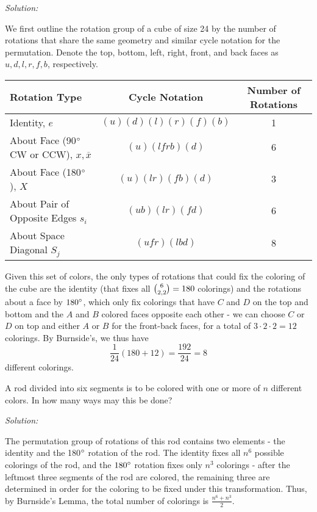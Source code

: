 \documentclass[12pt]{scrartcl}
\newenvironment{problem}[2][Problem]{\begin{trivlist}
\item[\hskip \labelsep {\bfseries #1}\hskip \labelsep {\bfseries #2.}]}{\end{trivlist}}
\newenvironment{solution}
    {\emph{Solution:}
    }
    {
    \qedhere
    }
\begin{document}
\begin{solution}
We first outline the rotation group of a cube of size 24 by the number of rotations that share the same geometry and similar cycle notation for the permutation. Denote the top, bottom, left, right, front, and back faces as $u, d, l, r, f, b$, respectively. 
\begin{center}
\begin{tabular}{m{5cm}| c | c}
\centering Rotation Type & Cycle Notation & Number of Rotations \\ \hline 
\centering Identity, $e$ & $(u)(d)(l)(r)(f)(b)$ & 1 \\ 
\centering About Face (90$^\circ$ CW or CCW), $x, \overline{x}$ & $(u)(lfrb)(d)$ & 6 \\
\centering About Face (180$^\circ$), $X$ & $(u)(lr)(fb)(d)$ & 3 \\
\centering About Pair of Opposite Edges $s_i$ & $(ub)(lr)(fd)$ & 6 \\
\centering About Space Diagonal $S_j$ & $(ufr)(lbd)$ & 8 \\
\end{tabular}
\end{center}

Given this set of colors, the only types of rotations that could fix the coloring of the cube are the identity (that fixes all $\tbinom{6}{2, 2} = 180$ colorings) and the rotations about a face by $180^\circ$, which only fix colorings that have $C$ and $D$ on the top and bottom and the $A$ and $B$ colored faces opposite each other - we can choose $C$ or $D$ on top and either $A$ or $B$ for the front-back faces, for a total of $3 \cdot 2 \cdot 2 = 12$ colorings. By Burnside's, we thus have
\[
	\frac{1}{24}(180 + 12) = \frac{192}{24} = \boxed{8}
\]
different colorings. 
\end{solution}

\begin{problem}{3} 
A rod divided into six segments is to be colored with one or more of $n$ different colors. In how many ways may this be done? 

\end{problem}

\begin{solution}
The permutation group of rotations of this rod contains two elements - the identity and the 180$^\circ$ rotation of the rod. The identity fixes all $n^6$ possible colorings of the rod, and the $180^\circ$ rotation fixes only $n^3$ colorings - after the leftmost three segments of the rod are colored, the remaining three are determined in order for the coloring to be fixed under this transformation. Thus, by Burnside's Lemma, the total number of colorings is $\boxed{\frac{n^6+n^3}{2}}$.
\end{solution}
\end{document}
